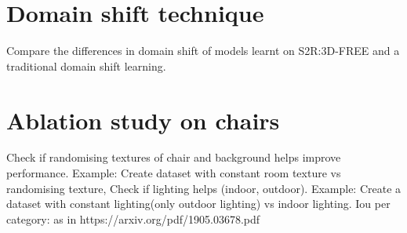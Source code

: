\section{Domain shift technique}

Compare the differences in domain shift of models learnt on S2R:3D-FREE and a traditional domain shift learning.

\section{Ablation study on chairs}
Check if randomising textures of chair and background helps improve performance.  Example: Create dataset with constant room texture vs randomising texture,
Check if lighting helps (indoor, outdoor). Example: Create a dataset with constant lighting(only outdoor lighting) vs indoor lighting.
Iou per category: as in https://arxiv.org/pdf/1905.03678.pdf
